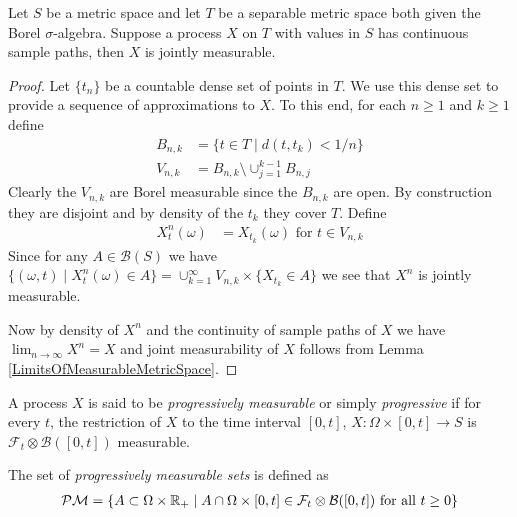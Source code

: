 \begin{lem}\label{JointMeasurabilityOfSampleContinuous}Let $S$ be a metric space and let $T$ be a separable metric
  space both given the Borel $\sigma$-algebra.  Suppose a process $X$
  on $T$ with values in $S$ has continuous sample paths, then $X$ is
  jointly measurable.
\end{lem}
\begin{proof}
Let $\lbrace t_n \rbrace$ be a countable dense set of points in $T$.
We use this dense set to provide a sequence of approximations to $X$.
To this end, for each $n\geq 1$ and $k \geq 1$ define
\begin{align*}
B_{n,k} &= \lbrace t \in T \mid d(t, t_k) < 1/n \rbrace \\
V_{n,k} &= B_{n,k} \setminus \cup_{j=1}^{k-1} B_{n,j}
\end{align*}
Clearly the $V_{n,k}$ are Borel measurable since the $B_{n,k}$ are open.
By construction they are disjoint and by density of the $t_k$ they
cover $T$.  Define
\begin{align*}
X^n_t (\omega) &= X_{t_k}(\omega) \text{ for $t \in V_{n,k}$}
\end{align*}
Since for any $A \in \mathcal{B}(S)$ we have $\lbrace (\omega, t) \mid
X^n_{t}(\omega) \in A \rbrace = \cup_{k=1}^\infty V_{n,k} \times \lbrace
X_{t_k} \in A \rbrace$ we see that $X^n$ is jointly measurable.

Now by density of $X^n$ and the continuity of sample paths of $X$ we
have $\lim_{n \to \infty} X^n = X$ and joint measurability of $X$
follows from Lemma \ref{LimitsOfMeasurableMetricSpace}.
\end{proof}

\begin{defn}A process $X$ is said to be \emph{progressively
    measurable} or simply \emph{progressive} if for every $t$, the restriction of $X$ to the time
  interval $[0,t]$, $X : \Omega \times [0,t] \to S$ is
  $\mathcal{F}_t \otimes \mathcal{B}([0,t])$ measurable.
\end{defn}

\begin{defn}The set of \emph{progressively measurable sets} is
  defined as
\begin{align*}
\mathcal{P}\mathcal{M} = \lbrace A \subset \Omega
  \times \mathbb{R}_+ \mid A \cap \Omega \times [0,t] \in \mathcal{F}_t
  \otimes \mathcal{B}([0,t]) \text{ for all } t \geq 0\rbrace
\end{align*}
\end{defn}

